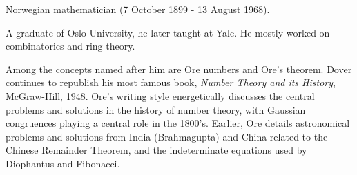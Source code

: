 \documentclass[12pt]{article}
\begin{document}
Norwegian mathematician (7 October 1899 - 13 August 1968).

A graduate of Oslo University, he later taught at Yale. He mostly worked on combinatorics and ring theory.

Among the concepts named after him are Ore numbers and Ore's theorem. Dover continues to republish his most famous book, {\it Number Theory and its History}, McGraw-Hill, 1948. Ore's writing style energetically discusses the central problems and solutions in the history of number theory, with Gaussian congruences playing a central role in the 1800's. Earlier, Ore details astronomical problems and solutions from India (Brahmagupta) and China related to the Chinese Remainder Theorem, and the indeterminate equations used by Diophantus and Fibonacci. 
\end{document}
